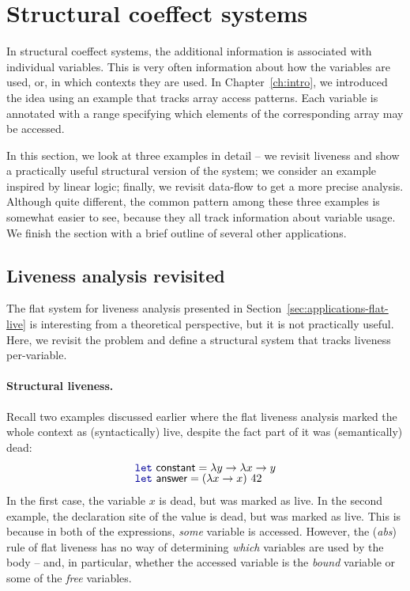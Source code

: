 \section{Structural coeffect systems}
\label{sec:applications-structural}

In structural coeffect systems, the additional information is associated with individual variables.
This is very often information about how the variables are used, or, in which contexts they are used.
In Chapter~\ref{ch:intro}, we introduced the idea using an example that tracks array access patterns.
Each variable is annotated with a range specifying which elements of the corresponding array
may be accessed.

In this section, we look at three examples in detail -- we revisit liveness and show a practically
useful structural version of the system; we consider an example inspired by linear logic; finally,
we revisit data-flow to get a more precise analysis. Although quite different, the common pattern
among these three examples is somewhat easier to see, because they all track information about
variable usage. We finish the section with a brief outline of several other applications.


\subsection{Liveness analysis revisited}
\label{sec:applications-struct-live}

The flat system for liveness analysis presented in Section~\ref{sec:applications-flat-live} is
interesting from a theoretical perspective, but it is not practically useful. Here, we
revisit the problem and define a structural system that tracks liveness per-variable.

\paragraph{Structural liveness.}
Recall two examples discussed earlier where the flat liveness analysis marked the whole context
as (syntactically) live, despite the fact part of it was (semantically) dead:
%
\begin{equation*}
\begin{array}{l}
\kvd{let}~\ident{constant} = \lambda y \rightarrow \lambda x \rightarrow y\\[-0.25em]
\kvd{let}~\ident{answer} = (\lambda x \rightarrow x)~42
\end{array}
\end{equation*}
%
In the first case, the variable $x$ is dead, but was marked as live. In the second example, the
declaration site of the  value is dead, but was marked as live. This is because in
both of the expressions, \emph{some} variable is accessed. However, the (\emph{abs}) rule of flat
liveness has no way of determining \emph{which} variables are used by the body -- and, in particular,
whether the accessed variable is the \emph{bound} variable or some of the \emph{free} variables.

